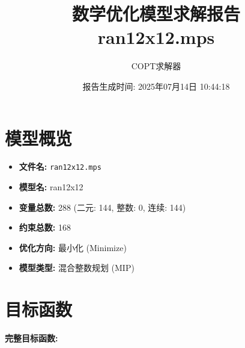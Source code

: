 \documentclass[a4paper,10pt]{article}
\title{数学优化模型求解报告\\{\large ran12x12.mps}}
\author{COPT求解器}
\date{报告生成时间: 2025年07月14日 10:44:18}
\begin{document}
\maketitle
\tableofcontents
\newpage

\section{模型概览}
\begin{itemize}
    \item \textbf{文件名:} \texttt{ran12x12.mps}
    \item \textbf{模型名:} ran12x12
    \item \textbf{变量总数:} 288 (二元: 144, 整数: 0, 连续: 144)
    \item \textbf{约束总数:} 168
    \item \textbf{优化方向:} 最小化 (Minimize)
    \item \textbf{模型类型:} 混合整数规划 (MIP)
\end{itemize}
\section{目标函数}

\textbf{完整目标函数:}
\end{document}
